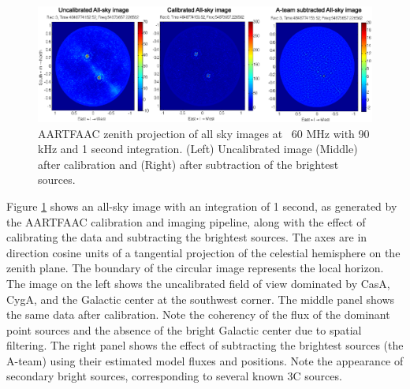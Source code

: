 \documentclass[referee]{aa}
\begin{document}
\begin{figure}[t]
\includegraphics[width=1\textwidth]{Figs/uncal_cal_deconv_night.eps}
\caption{AARTFAAC zenith projection of all sky images at ~60  MHz with 90 kHz
  and  1   second  integration.   (Left)  Uncalibrated  image   (Middle)  after
  calibration and (Right) after subtraction of the brightest sources.}
\label{fig:uncal_cal_deconv_night}
\end{figure}

Figure   \ref{fig:uncal_cal_deconv_night}  shows  an   all-sky  image   with  an
integration of  1 second, as generated  by the AARTFAAC  calibration and imaging
pipeline,  along with the  effect of  calibrating the  data and  subtracting the
brightest  sources.  The  axes are  in direction  cosine units  of  a tangential
projection of the celestial hemisphere on the zenith plane.  The boundary of the
circular image  represents the local  horizon. The image  on the left  shows the
uncalibrated field of  view dominated by CasA, CygA, and  the Galactic center at
the southwest  corner. The middle panel shows the  same data after calibration.
Note the coherency of the flux of the dominant point sources and the absence of
the bright Galactic center due to  spatial filtering.  The right panel shows the
effect of subtracting  the brightest sources (the A-team)  using their estimated
model fluxes  and positions.  Note  the appearance of secondary  bright sources,
corresponding to several known 3C sources.

 
\end{document}
